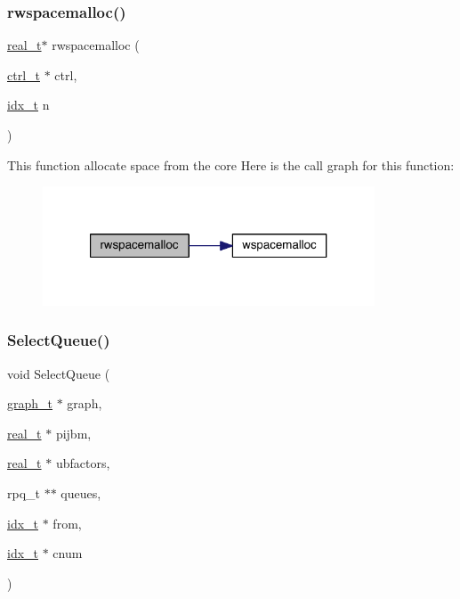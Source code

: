 \subsubsection{\texorpdfstring{rwspacemalloc()}{rwspacemalloc()}}
{\footnotesize\ttfamily \hyperlink{a00876_a1924a4f6907cc3833213aba1f07fcbe9}{real\+\_\+t}$\ast$ rwspacemalloc (\begin{DoxyParamCaption}\item[{\hyperlink{a00742}{ctrl\+\_\+t} $\ast$}]{ctrl,  }\item[{\hyperlink{a00876_aaa5262be3e700770163401acb0150f52}{idx\+\_\+t}}]{n }\end{DoxyParamCaption})}

This function allocate space from the core Here is the call graph for this function\+:\nopagebreak
\begin{figure}[H]
\begin{center}
\leavevmode
\includegraphics[width=280pt]{a00945_a8fbf14fa1b6600107eb5a03c655e50a4_cgraph}
\end{center}
\end{figure}
\mbox{\label{a00945_a51193f4b76d298d94234642136879390}} 
\subsubsection{\texorpdfstring{Select\+Queue()}{SelectQueue()}}
{\footnotesize\ttfamily void Select\+Queue (\begin{DoxyParamCaption}\item[{\hyperlink{a00734}{graph\+\_\+t} $\ast$}]{graph,  }\item[{\hyperlink{a00876_a1924a4f6907cc3833213aba1f07fcbe9}{real\+\_\+t} $\ast$}]{pijbm,  }\item[{\hyperlink{a00876_a1924a4f6907cc3833213aba1f07fcbe9}{real\+\_\+t} $\ast$}]{ubfactors,  }\item[{rpq\+\_\+t $\ast$$\ast$}]{queues,  }\item[{\hyperlink{a00876_aaa5262be3e700770163401acb0150f52}{idx\+\_\+t} $\ast$}]{from,  }\item[{\hyperlink{a00876_aaa5262be3e700770163401acb0150f52}{idx\+\_\+t} $\ast$}]{cnum }\end{DoxyParamCaption})}

